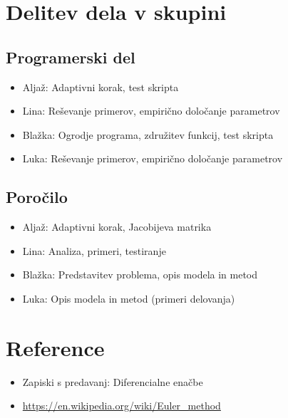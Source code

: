 \documentclass[12pt]{article}
\begin{document}
	\newpage
	\section{Delitev dela v skupini}
	\subsection{Programerski del}
	\begin{itemize}
		\item Aljaž: Adaptivni korak, test skripta
		\item Lina: Reševanje primerov, empirično določanje parametrov
		\item Blažka: Ogrodje programa, združitev funkcij, test skripta
		\item Luka: Reševanje primerov, empirično določanje parametrov
	\end{itemize}
	\subsection{Poročilo}
	\begin{itemize}
		\item Aljaž: Adaptivni korak, Jacobijeva matrika
		\item Lina: Analiza, primeri, testiranje
		\item Blažka: Predstavitev problema, opis modela in metod
		\item Luka: Opis modela in metod (primeri delovanja)
	\end{itemize}
	\section{Reference}
	\begin{itemize}
		\item Zapiski s predavanj: Diferencialne enačbe
		\item \url{https://en.wikipedia.org/wiki/Euler_method}
	\end{itemize}
\end{document}
